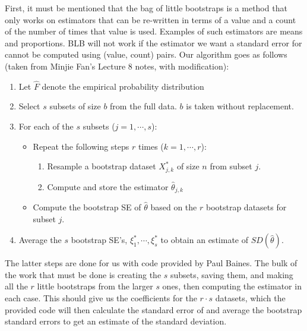 \documentclass[12pt]{article}
\begin{document}
First, it must be mentioned that the bag of little bootstraps is a method that only works on estimators that can be re-written in terms of a value and a count of the number of times that value is used. Examples of such estimators are means and proportions. BLB will not work if the estimator we want a standard error for cannot be computed using (value, count) pairs. Our algorithm goes as follows (taken from Minjie Fan's Lecture 8 notes, with modification):
\begin{enumerate}
  \item Let $\hat{F}$ denote the empirical probability distribution
  \item Select $s$ subsets of size $b$ from the full data. $b$ is taken without replacement.
  \item For each of the $s$ subsets ($j=1,\cdots,s$):
    \begin{itemize}
      \item Repeat the following steps $r$ times ($k=1,\cdots,r$):
        \begin{enumerate}
          \item Resample a bootstrap dataset $X_{j,k}^*$ of size $n$ from subset $j$.
          \item Compute and store the estimator $\hat{\theta}_{j,k}$
        \end{enumerate}
      \item Compute the bootstrap SE of $\hat{\theta}$ based on the $r$ bootstrap datasets for subset $j$.
    \end{itemize}
  \item Average the $s$ bootstrap SE's, $\xi_1^*,\cdots,\xi_s^*$ to obtain an estimate of $SD(\hat{\theta})$.
\end{enumerate}
The latter steps are done for us with code provided by Paul Baines. The bulk of the work that must be done is creating the $s$ subsets, saving them, and making all the $r$ little bootstraps from the larger $s$ ones, then computing the estimator in each case. This should give us the coefficients for the $r \cdot s$ datasets, which the provided code will then calculate the standard error of and average the bootstrap standard errors to get an estimate of the standard deviation. 
\end{document}
